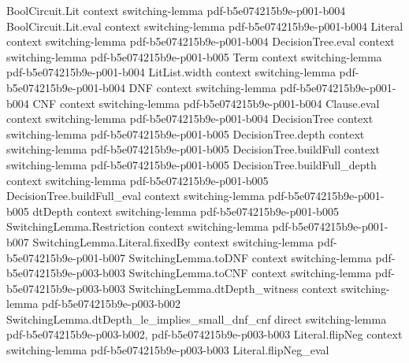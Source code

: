 \begin{theorem}
\label{LMN.dtDepth_le_implies_nice_cnf}
\leanok
{}
\proofstep
  {BoolCircuit.Lit}
  {context}
  {switching-lemma}
  {pdf-b5e074215b9e-p001-b004}
\proofstep
  {BoolCircuit.Lit.eval}
  {context}
  {switching-lemma}
  {pdf-b5e074215b9e-p001-b004}
\proofstep
  {Literal}
  {context}
  {switching-lemma}
  {pdf-b5e074215b9e-p001-b004}
\proofstep
  {DecisionTree.eval}
  {context}
  {switching-lemma}
  {pdf-b5e074215b9e-p001-b005}
\proofstep
  {Term}
  {context}
  {switching-lemma}
  {pdf-b5e074215b9e-p001-b004}
\proofstep
  {LitList.width}
  {context}
  {switching-lemma}
  {pdf-b5e074215b9e-p001-b004}
\proofstep
  {DNF}
  {context}
  {switching-lemma}
  {pdf-b5e074215b9e-p001-b004}
\proofstep
  {CNF}
  {context}
  {switching-lemma}
  {pdf-b5e074215b9e-p001-b004}
\proofstep
  {Clause.eval}
  {context}
  {switching-lemma}
  {pdf-b5e074215b9e-p001-b004}
\proofstep
  {DecisionTree}
  {context}
  {switching-lemma}
  {pdf-b5e074215b9e-p001-b005}
\proofstep
  {DecisionTree.depth}
  {context}
  {switching-lemma}
  {pdf-b5e074215b9e-p001-b005}
\proofstep
  {DecisionTree.buildFull}
  {context}
  {switching-lemma}
  {pdf-b5e074215b9e-p001-b005}
\proofstep
  {DecisionTree.buildFull_depth}
  {context}
  {switching-lemma}
  {pdf-b5e074215b9e-p001-b005}
\proofstep
  {DecisionTree.buildFull_eval}
  {context}
  {switching-lemma}
  {pdf-b5e074215b9e-p001-b005}
\proofstep
  {dtDepth}
  {context}
  {switching-lemma}
  {pdf-b5e074215b9e-p001-b005}
\proofstep
  {SwitchingLemma.Restriction}
  {context}
  {switching-lemma}
  {pdf-b5e074215b9e-p001-b007}
\proofstep
  {SwitchingLemma.Literal.fixedBy}
  {context}
  {switching-lemma}
  {pdf-b5e074215b9e-p001-b007}
\proofstep
  {SwitchingLemma.toDNF}
  {context}
  {switching-lemma}
  {pdf-b5e074215b9e-p003-b003}
\proofstep
  {SwitchingLemma.toCNF}
  {context}
  {switching-lemma}
  {pdf-b5e074215b9e-p003-b003}
\proofstep
  {SwitchingLemma.dtDepth_witness}
  {context}
  {switching-lemma}
  {pdf-b5e074215b9e-p003-b002}
\proofstep
  {SwitchingLemma.dtDepth_le_implies_small_dnf_cnf}
  {direct}
  {switching-lemma}
  {pdf-b5e074215b9e-p003-b002,
    pdf-b5e074215b9e-p003-b003}
\proofstep
  {Literal.flipNeg}
  {context}
  {switching-lemma}
  {pdf-b5e074215b9e-p003-b003}
\proofstep
  {Literal.flipNeg_eval}

\end{theorem}
